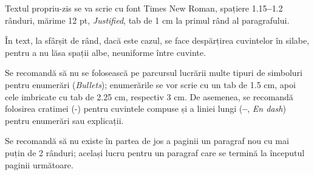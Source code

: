 Textul propriu-zis se va scrie cu font Times New Roman, spațiere 1.15\textbf{--}1.2 rânduri, mărime 12 pt, \textit{Justified}, tab de 1 cm la primul rând al paragrafului.

În text, la sfârșit de rând, dacă este cazul, se face despărțirea cuvintelor în silabe, pentru a nu lăsa spații albe, neuniforme între cuvinte.

Se recomandă să nu se folosească pe parcursul lucrării multe tipuri de simboluri pentru enumerări (\textit{Bullets}); enumerările se vor scrie cu un tab de 1.5 cm, apoi cele imbricate cu tab de 2.25 cm, respectiv 3 cm. De asemenea, se recomandă folosirea cratimei (-) pentru cuvintele compuse și a liniei lungi (\textbf{--}, \textit{En dash}) pentru enumerări sau explicații.

Se recomandă să nu existe în partea de jos a paginii un paragraf nou cu mai puțin de 2 rânduri; același lucru pentru un paragraf care se termină la începutul paginii următoare.

